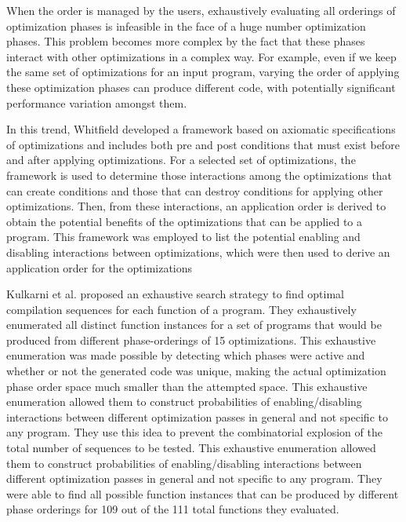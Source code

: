 When the order is managed by the users, exhaustively evaluating  all orderings of optimization phases is infeasible in the face of a huge number optimization phases. This problem becomes more complex by the fact that these phases interact with other optimizations in a complex way.
For example, even if we keep the same set of optimizations for an input program, varying the order of applying these optimization phases can produce different code, with potentially significant performance variation amongst them. 

In this trend, Whitfield developed a framework based on axiomatic specifications of optimizations and includes both pre and post conditions that must exist before and after applying optimizations\cite{whitfield1990approach}. For a selected set of optimizations, the framework is used to determine those interactions among the optimizations that can create conditions and those that can destroy conditions for applying other optimizations. Then, from these interactions, an application order is derived to obtain the potential benefits of the optimizations that can be applied to a program. 
This framework was employed to list the potential enabling and disabling interactions between optimizations, which were then used to derive an application
order for the optimizations

Kulkarni et al.\cite{kulkarni2009practical,kulkarni2006exhaustive} proposed an exhaustive search strategy to find optimal compilation sequences for each function of a program. They exhaustively enumerated all distinct function instances for a set of programs that would be produced from different phase-orderings of 15 optimizations. This exhaustive enumeration was made possible by detecting which phases were active and whether or not the generated code was unique, making the actual optimization phase order space much smaller than the attempted space. This exhaustive enumeration allowed them to construct probabilities of enabling/disabling interactions between different optimization passes in general and not specific to any program. They use this idea to prevent the combinatorial explosion of the total number of sequences to be tested. 
This exhaustive enumeration allowed them to construct probabilities of enabling/disabling interactions between different optimization passes in general and not specific to any program. 
They were able to find all possible function instances that can be produced by different phase orderings for 109 out of the 111 total functions they evaluated.



